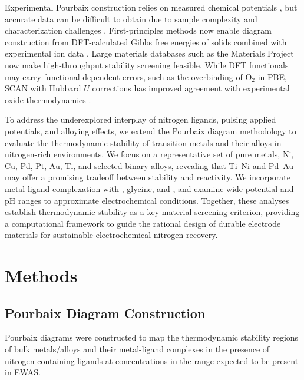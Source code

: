 \documentclass[journal=jacsat,manuscript=article]{achemso}
\begin{document}
Experimental Pourbaix construction relies on measured chemical potentials \cite{PourbaixAtlasSolutions, Pourbaix1973LecturesCorrosion, Beverskog1999PourbaixIron-Chromium-Nickel}, but accurate data can be difficult to obtain due to sample complexity and characterization challenges \cite{Huang2017ImprovedCompounds}. First-principles methods now enable diagram construction from DFT-calculated Gibbs free energies of solids combined with experimental ion data \cite{Wang2020PredictingFunctional, Lopez2023ComputationalStudies, Liu2024ReversiblePH, Ding2018ElectrochemicalStates, Huang2015ElectrochemicalCalculations, Persson2012PredictionStates, Patel2019EfficientCompounds, Oses2018AFLOW-CHULL:Analysis}. Large materials databases such as the Materials Project \cite{Ong2013PythonAnalysis, Singh2017ElectrochemicalMaterials, Jain2011FormationCalculations, Montoya2015TheoreticalSplitting, Singh2019RobustDiscovery} now make high-throughput stability screening feasible. While DFT functionals may carry functional-dependent errors, such as the overbinding of O$_2$ in PBE, SCAN with Hubbard $U$ corrections has improved agreement with experimental oxide thermodynamics \cite{Wang2020PredictingFunctional}.


To address the underexplored interplay of nitrogen ligands, pulsing applied potentials, and alloying effects, we extend the Pourbaix diagram methodology to evaluate the thermodynamic stability of transition metals and their alloys in nitrogen-rich environments. We focus on a representative set of pure metals, Ni, Cu, Pd, Pt, Au, Ti, and selected binary alloys, revealing that Ti–Ni and Pd–Au may offer a promising tradeoff between stability and reactivity. We incorporate metal-ligand complexation with , glycine, and , and examine wide potential and pH ranges to approximate electrochemical conditions. Together, these analyses establish thermodynamic stability as a key material screening criterion, providing a computational framework to guide the rational design of durable electrode materials for sustainable electrochemical nitrogen recovery.


\section{Methods}
\subsection{Pourbaix Diagram Construction}
Pourbaix diagrams were constructed to map the thermodynamic stability regions of bulk metals/alloys and their metal-ligand complexes in the presence of nitrogen-containing ligands at concentrations in the range expected to be present in EWAS.
\end{document}
